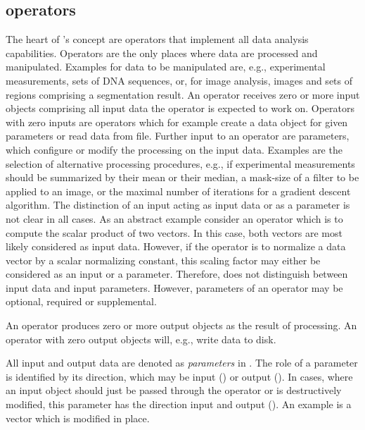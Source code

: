 \subsection{\alida operators}
\label{subsec:operators-user}

The heart of \alida's concept are operators that implement all data analysis capabilities. 
Operators are the only places where data are processed and manipulated.
Examples for data to be manipulated are, e.g., experimental measurements,
sets of DNA sequences, or, for image analysis, images and sets of regions
comprising a segmentation result. An operator receives zero or more input objects
comprising all input data the operator is expected to work on.
Operators with zero inputs are operators which for example create a data object
for given parameters or read data from file.
Further input to an operator are parameters, which configure or
modify the processing on the input data.
Examples are the selection of alternative processing procedures, e.g., if
experimental measurements should be summarized by their mean or their median,
a mask-size of a filter to be applied to an image, or the maximal number
of iterations for a gradient descent algorithm.
The distinction of an input acting as input data or as a parameter is not
clear in all cases.
As an abstract example consider an operator which is 
to compute the scalar product of two vectors.
In this case, both vectors are most likely considered as input data.
However, if the operator is
to normalize 
a data vector by a scalar normalizing constant,
this scaling factor may either be considered as an input or a parameter.
Therefore, \alida does not distinguish between input data and input parameters.
However, parameters of an operator may be optional, required or supplemental.

An operator produces zero or more output objects  as the result of processing.
An operator with zero output objects will, e.g., write data to disk.

All input and output data are denoted as {\em parameters} in \alida.
The role of a parameter is identified by its direction,
which may be input () or output ().
In cases, where an input object should just be passed through the operator or is
destructively modified, this parameter has the direction input and output
(). An example is a vector which is modified in place.


